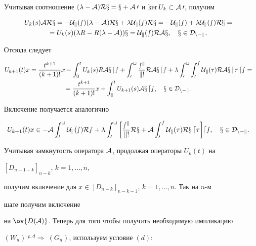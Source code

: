 \begin{pf}
Учитывая соотношение $(\lambda-\cal A)Rx=x+\cal A0$ и $\ker U_k\subset\cal 


A0$, получим 


\begin{multline*} 


U_k(s)\cal A Rx=-U_k(s)(\lambda-\cal A)Rx+\lambda U_k(s)Rx= 


-U_k(s)+\lambda U_k(s)Rx= \\ 


% 


=U_k(s)(\lambda R-R(\lambda-\cal A))x=U_k(s)R\cal A x,\quad 


x\in D_{n-k}. 


\end{multline*} 


Отсюда следует 


\begin{multline*} 


U_{k+1}(t)x=\frac{t^{k+1}}{(k+1)!}x-\int^t_0 U_k(s)R\cal A x\,ds+ 


\int^t_0 \frac{s^k}{k!}R\cal A x\,ds+\lambda\int^t_0\int^s_0 


U_k(\tau)R\cal A x\,d\tau\,ds= \\ 


% 


=\frac{t^{k+1}}{(k+1)!}x+\int^t_0 U_{k+1}(s)\cal A x\,ds,\quad 


x\in D_{n-k}. 


\end{multline*} 


Включение получается аналогично 


$$ 


U_{k+1}(t)x\in-\cal A\int^t_0 U_k(s)Rs+\lambda\int^t_0\bigg[ 


\frac{s^k}{k!}Rx+\cal A\int^s_0 U_k(\tau)Rx\,d\tau\bigg]ds,\quad 


x\in D_{n-k}. 


$$ 


Учитывая замкнутость оператора $\cal A$, продолжая операторы $U_k(t)$ на 


$[D_{n+1-k}]_{n-k}$, $k=1,\dotsc,n$, 


получим включение для $x\in[D_{n-k}]_{n-k-1}$, $k=1,\dotsc,n$. Так на $n$-м 


шаге получим включение 


на $\ov{D(\cal A)}$. Теперь для того чтобы получить необходимую импликацию 


$(W_n)\;{}^{\rho,d}\Longrightarrow\;(G_{n})$, используем условие $(d)$: 



\end{pf}
